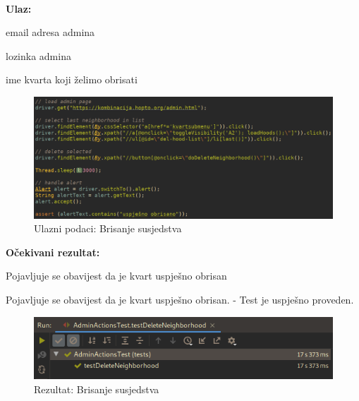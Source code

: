 			\
			
			\noindent \textbf{Ulaz:}
			
			\begin{packed_enum}
				\item email adresa admina
				\item lozinka admina
				\item ime kvarta koji želimo obrisati 
				
				\end{packed_enum}
					
			\begin{figure}[H]
					\includegraphics[scale=0.57]{figures/admin-delete-neighborhood-code.PNG}
					\centering
					\caption{Ulazni podaci: Brisanje susjedstva}
					\label{fig:Brisanje susjedstva}
				\end{figure}	
				
		


			\noindent \textbf{Očekivani rezultat:}
				\begin{packed_enum}
				\item Pojavljuje se obavijest da je kvart uspješno obrisan
							
				
			\end{packed_enum}
			
		
			Pojavljuje se obavijest da je kvart uspješno obrisan. - Test je uspješno proveden.	


				\begin{figure}[H]
					\includegraphics[scale=0.57]{figures/admin-delete-neighborhood-pass.PNG}
					\centering
					\caption{Rezultat: Brisanje susjedstva}
					\label{fig:Brisanje susjedstva}
				\end{figure}

